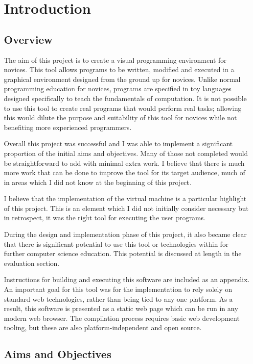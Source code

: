 \chapter{Introduction}

\section{Overview}

The aim of this project is to create a visual programming environment for novices. This tool allows programs to be written, modified and executed in a graphical environment designed from the ground up for novices. Unlike normal programming education for novices, programs are specified in toy languages designed specifically to teach the fundamentals of computation. It is not possible to use this tool to create real programs that would perform real tasks; allowing this would dilute the purpose and suitability of this tool for novices while not benefiting more experienced programmers.

Overall this project was successful and I was able to implement a significant proportion of the initial aims and objectives. Many of those not completed would be straightforward to add with minimal extra work. I believe that there is much more work that can be done to improve the tool for its target audience, much of in areas which I did not know at the beginning of this project.

I believe that the implementation of the virtual machine is a particular highlight of this project. This is an element which I did not initially consider necessary but in retrospect, it was the right tool for executing the user programs.

During the design and implementation phase of this project, it also became clear that there is significant potential to use this tool or technologies within for further computer science education. This potential is discussed at length in the evaluation section.

Instructions for building and executing this software are included as an appendix. An important goal for this tool was for the implementation to rely solely on standard web technologies, rather than being tied to any one platform. As a result, this software is presented as a static web page which can be run in any modern web browser. The compilation process requires basic web development tooling, but these are also platform-independent and open source.

\section{Aims and Objectives}

